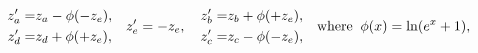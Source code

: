 \begin{equation}\label{flipfovarclass}\begin{aligned}
z_a'=& z_a-\phi(-z_e),\\
z_d'=& z_d+\phi(+z_e),
\end{aligned} 
\quad z_e'=-z_e,\quad\begin{aligned}
z_b'=& z_b+\phi(+z_e),\\
z_c'=& z_c-\phi(-z_e),
\end{aligned}\quad{\rm where}\;\;\phi(x)=\ln(e^x+1),
\end{equation}

